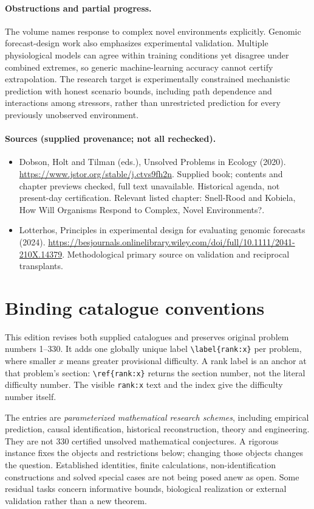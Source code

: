 \documentclass[11pt]{article}
\begin{document}
\paragraph{Obstructions and partial progress.} The volume names response to complex novel environments explicitly. Genomic forecast-design work also emphasizes experimental validation. Multiple physiological models can agree within training conditions yet disagree under combined extremes, so generic machine-learning accuracy cannot certify extrapolation. The research target is experimentally constrained mechanistic prediction with honest scenario bounds, including path dependence and interactions among stressors, rather than unrestricted prediction for every previously unobserved environment.
\paragraph{Sources (supplied provenance; not all rechecked).}
\begin{itemize}
\item Dobson, Holt and Tilman (eds.), Unsolved Problems in Ecology (2020). \url{https://www.jstor.org/stable/j.ctvs9fh2n}. Supplied book; contents and chapter previews checked, full text unavailable. Historical agenda, not present-day certification. Relevant listed chapter: Snell-Rood and Kobiela, How Will Organisms Respond to Complex, Novel Environments?.
\item Lotterhos, Principles in experimental design for evaluating genomic forecasts (2024). \url{https://besjournals.onlinelibrary.wiley.com/doi/full/10.1111/2041-210X.14379}. Methodological primary source on validation and reciprocal transplants.
\end{itemize}


\section*{Binding catalogue conventions}
This edition revises both supplied catalogues and preserves original problem numbers 1--330. It adds one globally unique label \verb|\label{rank:x}| per problem, where smaller $x$ means greater provisional difficulty. A rank label is an anchor at that problem's section: \verb|\ref{rank:x}| returns the section number, not the literal difficulty number. The visible \texttt{rank:x} text and the index give the difficulty number itself.

The entries are \emph{parameterized mathematical research schemes}, including empirical prediction, causal identification, historical reconstruction, theory and engineering. They are not 330 certified unsolved mathematical conjectures. A rigorous instance fixes the objects and restrictions below; changing those objects changes the question. Established identities, finite calculations, non-identification constructions and solved special cases are not being posed anew as open. Some residual tasks concern informative bounds, biological realization or external validation rather than a new theorem.
\end{document}
